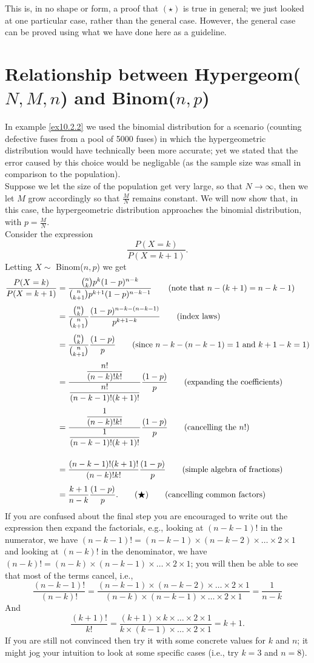 \noindent This is, in no shape or form, a proof that $(\star)$ is true in general; we just looked at one particular case, rather than the general case. However, the general case can be proved using what we have done here as a guideline.

\section{Relationship between Hypergeom($N,M,n$) and Binom($n,p$)}
In example \ref{ex10.2.2} we used the binomial distribution for a scenario (counting defective fuses from a pool of 5000 fuses) in which the hypergeometric distribution would have technically been more accurate; yet we stated that the error caused by this choice would be negligable (as the sample size was small in comparison to the population). \\

\noindent Suppose we let the size of the population get very large, so that $N \rightarrow \infty$, then we let $M$ grow accordingly so that $\frac{M}{N}$ remains constant. We will now show that, in this case, the hypergeometric distribution approaches the binomial distribution, with $p = \frac{M}{N}$. \\

\noindent Consider the expression
\[
\frac{P(X = k)}{P(X = k+1)}.
\]
Letting $X \sim$ Binom($n,p$) we get
\begin{align*}
\frac{P(X = k)}{P(X = k+1)} & = \frac{\binom{n}{k}p^k(1-p)^{n-k}}{\binom{n}{k+1}p^{k+1}(1-p)^{n-k-1}} \tag{note that $n-(k+1) = n-k-1$} \ssk
	& = \frac{\binom{n}{k}}{\binom{n}{k+1}}\frac{(1-p)^{n-k-(n-k-1)}}{p^{k+1-k}} \tag{index laws} \ssk
	& =  \frac{\binom{n}{k}}{\binom{n}{k+1}}\frac{(1-p)}{p} \tag{since $n-k-(n-k-1) = 1$ and $k+1-k = 1$} \ssk
	& = \frac{\displaystyle{\frac{n!}{(n-k)!k!}}}{\displaystyle{\frac{n!}{(n-k-1)!(k+1)!}}}\frac{(1-p)}{p} \tag{expanding the coefficients} \ssk
	& = \frac{\displaystyle{\frac{1}{(n-k)!k!}}}{\displaystyle{\frac{1}{(n-k-1)!(k+1)!}}}\frac{(1-p)}{p} \tag{cancelling the $n!$} \bsk
	& = \frac{(n-k-1)!(k+1)!}{(n-k)!k!}\frac{(1-p)}{p} \tag{simple algebra of fractions} \ssk
	& = \frac{k+1}{n-k} \frac{(1-p)}{p}. \qquad (\bigstar) \tag{cancelling common factors}
\end{align*}
If you are confused about the final step you are encouraged to write out the expression then expand the factorials, e.g., looking at $(n-k-1)!$ in the numerator, we have $(n-k-1)! = (n-k-1)\times(n-k-2)\times\ldots\times2\times1$ and looking at $(n-k)!$ in the denominator, we have $(n-k)! = (n-k)\times(n-k-1)\times\ldots\times2\times1$; you will then be able to see that most of the terms cancel, i.e.,
\[
\frac{(n-k-1)!}{(n-k)!} = \frac{(n-k-1)\times(n-k-2)\times\ldots\times2\times1}{(n-k)\times(n-k-1)\times\ldots\times2\times1} = \frac{1}{n-k}
\]
And
\[
\frac{(k+1)!}{k!} = \frac{(k+1)\times k \times \ldots \times 2 \times 1}{k \times (k-1) \times \ldots \times 2 \times 1} = k+1.
\]
If you are still not convinced then try it with some concrete values for $k$ and $n$; it might jog your intuition to look at some specific cases (i.e., try $k = 3$ and $n = 8$).

